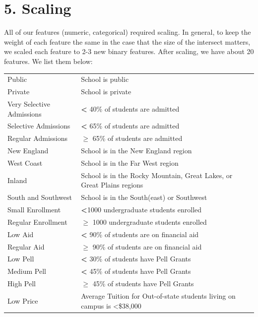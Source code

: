 \documentclass[12pt, a4, epsf] {article}
\theoremstyle{plain}
\theoremstyle{definition}
\begin{document}
\section*{5. Scaling}
All of our features (numeric, categorical) required scaling. In general, to keep the weight of each feature the same in the case that the size of the intersect matters, we scaled each feature to 2-3 new binary features. After scaling, we have about 20 features. We list them below:\\
\begin{table}[htbp]
\begin{tabular}{ll}
Public                    & School is public                                                                  \\
Private                   & School is private                                                                 \\
Very Selective Admissions & \textbf{\textless{}} 40\% of students are admitted                                          \\
Selective Admissions      & \textbf{\textless{}} 65\% of students are admitted                                          \\
Regular Admissions        & $\geq$ 65\% of students are admitted                                      \\
New England               & School is in the New England region                                               \\
West Coast                & School is in the Far West region                                                  \\
Inland                    & School is in the Rocky Mountain, Great Lakes, or Great Plains regions             \\
South and Southwest                & School is in the South(east) or Southwest \\
Small Enrollment          & \textbf{\textless{}}1000 undergraduate students enrolled                                 \\
Regular Enrollment        & $\geq$ 1000 undergraduate students enrolled                            \\
Low Aid                   & \textbf{\textless{}} 90\% of students are on financial aid                                  \\
Regular Aid               & $\geq$ 90\% of students are on financial aid                              \\
Low Pell                  & \textbf{\textless{} }30\% of students have Pell Grants                                      \\
Medium Pell               & \textbf{\textless{}} 45\% of students have Pell Grants                                      \\
High Pell                 & $\geq$ 45\% of students have Pell Grants                                  \\
Low Price                 & Average Tuition for Out-of-state students living on campus is \textless{}\$38,000
\end{tabular}
\end{table}
\end{document}
